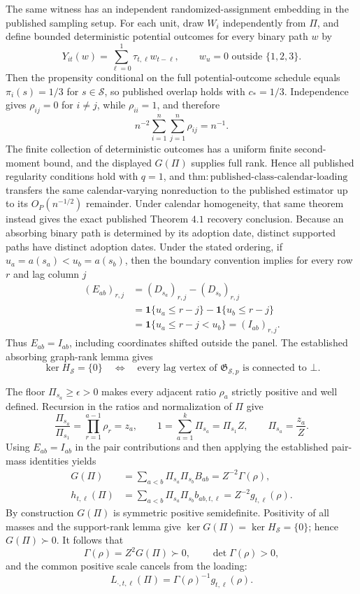 The same witness has an independent randomized-assignment embedding in the published sampling setup.  For each unit, draw \(W_i\) independently from \(\Pi\), and define bounded deterministic potential outcomes for every binary path \(w\) by
\[
 Y_{it}(w)=\sum_{\ell=0}^{1}\tau_{t,\ell}w_{t-\ell},
 \qquad w_u=0\text{ outside }\{1,2,3\}.
\]
Then the propensity conditional on the full potential-outcome schedule equals \(\pi_i(s)=1/3\) for \(s\in\mathcal S\), so published overlap holds with \(c_*=1/3\).  Independence gives \(\rho_{ij}=0\) for \(i\neq j\), while \(\rho_{ii}=1\), and therefore
\[
 n^{-2}\sum_{i=1}^{n}\sum_{j=1}^{n}\rho_{ij}=n^{-1}.
\]
The finite collection of deterministic outcomes has a uniform finite second-moment bound, and the displayed \(G(\Pi)\) supplies full rank.  Hence all published regularity conditions hold with \(q=1\), and \(\mathrm{thm{:}published\text{-}class\text{-}calendar\text{-}loading}\) transfers the same calendar-varying nonreduction to the published estimator up to its \(O_P(n^{-1/2})\) remainder.  Under calendar homogeneity, that same theorem instead gives the exact published Theorem \(4.1\) recovery conclusion.
Because an absorbing binary path is determined by its adoption date, distinct supported paths have distinct adoption dates.  Under the stated ordering, if \(u_a=a(s_a)<u_b=a(s_b)\), then the boundary convention implies for every row \(r\) and lag column \(j\)
\[
\begin{aligned}
 (E_{ab})_{r,j}
 &=(D_{s_a})_{r,j}-(D_{s_b})_{r,j}\\
 &=\mathbf 1\{u_a\leq r-j\}-\mathbf 1\{u_b\leq r-j\}\\
 &=\mathbf 1\{u_a\leq r-j<u_b\}
 =(I_{ab})_{r,j}.
\end{aligned}
\]
Thus \(E_{ab}=I_{ab}\), including coordinates shifted outside the panel.  The established absorbing graph-rank lemma gives
\[
 \ker H_{\mathcal S}=\{0\}
 \quad\Longleftrightarrow\quad
 \text{every lag vertex of }\mathfrak G_{\mathcal S,p}\text{ is connected to }\bot.
\]

The floor \(\Pi_{s_a}\geq\epsilon>0\) makes every adjacent ratio \(\rho_a\) strictly positive and well defined.  Recursion in the ratios and normalization of \(\Pi\) give
\[
 \frac{\Pi_{s_a}}{\Pi_{s_1}}
 =\prod_{r=1}^{a-1}\rho_r=z_a,
 \qquad
 1=\sum_{a=1}^{k}\Pi_{s_a}=\Pi_{s_1}Z,
 \qquad
 \Pi_{s_a}=\frac{z_a}{Z}.
\]
Using \(E_{ab}=I_{ab}\) in the pair contributions and then applying the established pair-mass identities yields
\[
\begin{aligned}
 G(\Pi)
 &=\sum_{a<b}\Pi_{s_a}\Pi_{s_b}B_{ab}
 =Z^{-2}\Gamma(\rho),\\
 h_{t,\ell}(\Pi)
 &=\sum_{a<b}\Pi_{s_a}\Pi_{s_b}b_{ab,t,\ell}
 =Z^{-2}g_{t,\ell}(\rho).
\end{aligned}
\]
By construction \(G(\Pi)\) is symmetric positive semidefinite.  Positivity of all masses and the support-rank lemma give
\(\ker G(\Pi)=\ker H_{\mathcal S}=\{0\}\); hence \(G(\Pi)\succ0\).  It follows that
\[
 \Gamma(\rho)=Z^2G(\Pi)\succ0,
 \qquad \det\Gamma(\rho)>0,
\]
and the common positive scale cancels from the loading:
\[
 L_{\cdot,t,\ell}(\Pi)=\Gamma(\rho)^{-1}g_{t,\ell}(\rho).
\]

